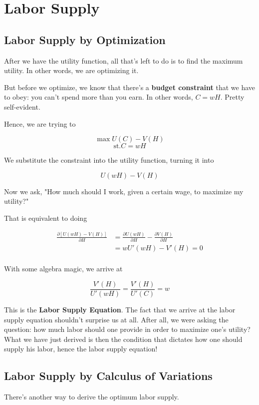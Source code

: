 \documentclass[11pt]{scrartcl}
\begin{document}
\section{Labor Supply}

\subsection{Labor Supply by Optimization}
After we have the utility function, all that's left to do is to find the maximum utility. In other words, we are optimizing it.

But before we optimize, we know that there's a \textbf{budget constraint} that we have to obey: you can't spend more than you earn. In other words, $C = wH$. Pretty self-evident.

Hence, we are trying to

\[\max U(C) - V(H) \]
\[\mathrm{st.} C=wH\]

We substitute the constraint into the utility function, turning it into

\[U(wH) - V(H)\]

Now we ask, "How much should I work, given a certain wage, to maximize my utility?"

That is equivalent to doing

\begin{align*}
\frac{\partial [U(wH) - V(H)]}{\partial H} &= \frac{\partial U(wH)}{\partial H} - \frac{\partial V(H)}{\partial H} \\
&= wU'(wH) - V'(H) = 0 \\
\end{align*}

With some algebra magic, we arrive at

\[ \frac{V'(H)}{U'(wH)} = \frac{V'(H)}{U'(C)} = w \]

This is the \textbf{Labor Supply Equation}. The fact that we arrive at the labor supply equation shouldn't surprise us at all. After all, we were asking the question: how much labor should one provide in order to maximize one's utility? What we have just derived is then the condition that dictates how one should supply his labor, hence the labor supply equation!

\subsection{Labor Supply by Calculus of Variations}

There's another way to derive the optimum labor supply. 
\end{document}
